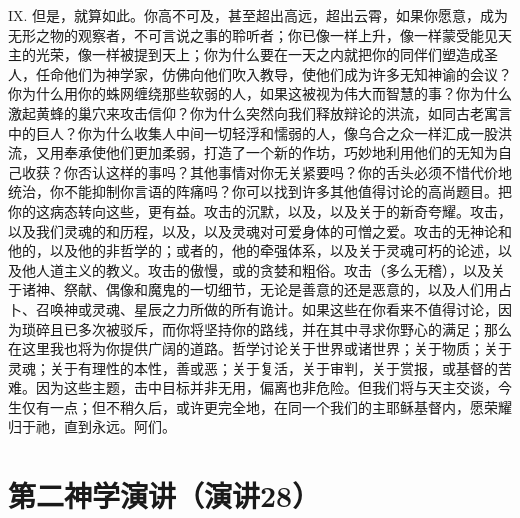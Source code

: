 IX. 但是，就算如此。你高不可及，甚至超出高远，超出云霄，如果你愿意，成为无形之物的观察者，不可言说之事的聆听者；你已像一样上升，像一样蒙受能见天主的光荣，像一样被提到天上；你为什么要在一天之内就把你的同伴们塑造成圣人，任命他们为神学家，仿佛向他们吹入教导，使他们成为许多无知神谕的会议？你为什么用你的蛛网缠绕那些软弱的人，如果这被视为伟大而智慧的事？你为什么激起黄蜂的巢穴来攻击信仰？你为什么突然向我们释放辩论的洪流，如同古老寓言中的巨人？你为什么收集人中间一切轻浮和懦弱的人，像乌合之众一样汇成一股洪流，又用奉承使他们更加柔弱，打造了一个新的作坊，巧妙地利用他们的无知为自己收获？你否认这样的事吗？其他事情对你无关紧要吗？你的舌头必须不惜代价地统治，你不能抑制你言语的阵痛吗？你可以找到许多其他值得讨论的高尚题目。把你的这病态转向这些，更有益。攻击的沉默，以及，以及关于的新奇夸耀。攻击，以及我们灵魂的和历程，以及，以及灵魂对可爱身体的可憎之爱。攻击的无神论和他的，以及他的非哲学的；或者的，他的牵强体系，以及关于灵魂可朽的论述，以及他人道主义的教义。攻击的傲慢，或的贪婪和粗俗。攻击（多么无稽），以及关于诸神、祭献、偶像和魔鬼的一切细节，无论是善意的还是恶意的，以及人们用占卜、召唤神或灵魂、星辰之力所做的所有诡计。如果这些在你看来不值得讨论，因为琐碎且已多次被驳斥，而你将坚持你的路线，并在其中寻求你野心的满足；那么在这里我也将为你提供广阔的道路。哲学讨论关于世界或诸世界；关于物质；关于灵魂；关于有理性的本性，善或恶；关于复活，关于审判，关于赏报，或基督的苦难。因为这些主题，击中目标并非无用，偏离也非危险。但我们将与天主交谈，今生仅有一点；但不稍久后，或许更完全地，在同一个我们的主耶稣基督内，愿荣耀归于祂，直到永远。阿们。\par



\section{第二神学演讲（演讲28）}

